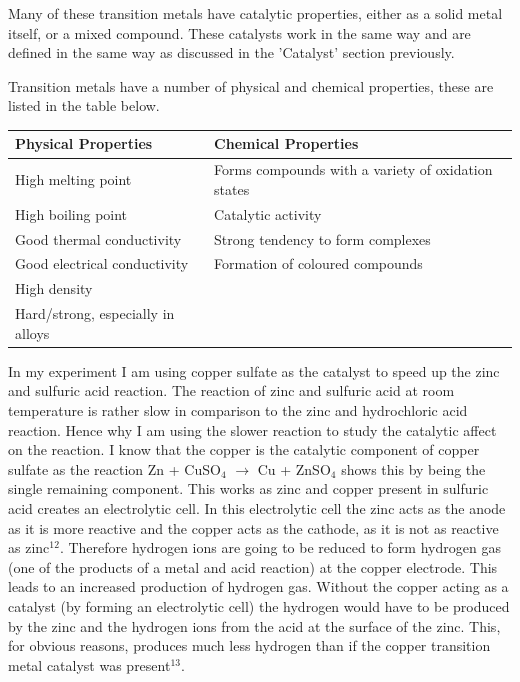 Many of these transition metals have catalytic properties, either as a solid metal itself, or a mixed compound. These catalysts work in the same way and are defined in the same way as discussed in the 'Catalyst' section previously.

Transition metals have a number of physical and chemical properties, these are listed in the table below.

\begin{center}
\begin{tabular}{|l|l|}
    \hline
    \textbf{Physical Properties} & \textbf{Chemical Properties} \\ \hline
High melting point & Forms compounds with a variety of oxidation states \\ \hline
High boiling point & Catalytic activity \\ \hline
Good thermal conductivity & Strong tendency to form complexes \\ \hline
Good electrical conductivity & Formation of coloured compounds \\ \hline
High density & \\ \hline
Hard/strong, especially in alloys & \\ \hline
\end{tabular}

\label{tab:Transition Metal Properties}
\end{center}

In my experiment I am using copper sulfate as the catalyst to speed up the zinc and sulfuric acid reaction. The reaction of zinc and sulfuric acid at room temperature is rather slow in comparison to the zinc and hydrochloric acid reaction. Hence why I am using the slower reaction to study the catalytic affect on the reaction. I know that the copper is the catalytic component of copper sulfate as the reaction Zn + CuSO$_4$ $\rightarrow$ Cu + ZnSO$_4$ shows this by being the single remaining component. This works as zinc and copper present in sulfuric acid creates an electrolytic cell. In this electrolytic cell the zinc acts as the anode as it is more reactive and the copper acts as the cathode, as it is not as reactive as zinc$^{12}$. Therefore hydrogen ions are going to be reduced to form hydrogen gas (one of the products of a metal and acid reaction) at the copper electrode. This leads to an increased production of hydrogen gas. Without the copper acting as a catalyst (by forming an electrolytic cell) the hydrogen would have to be produced by the zinc and the hydrogen ions from the acid at the surface of the zinc. This, for obvious reasons, produces much less hydrogen than if the copper transition metal catalyst was present$^{13}$.



